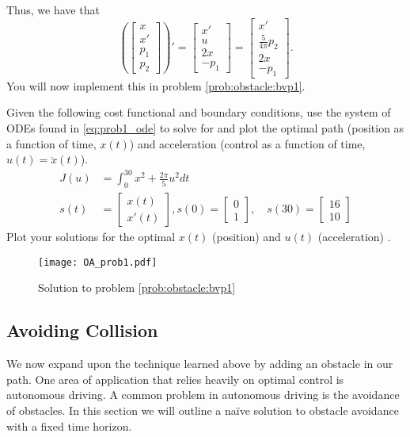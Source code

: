 Thus, we have that
\begin{equation}\label{eq:prob1_ode}
	\left( \begin{bmatrix}x\\x'\\p_1\\p_2\end{bmatrix} \right)' = \begin{bmatrix}x'\\u\\2x\\-p_1\end{bmatrix} = \begin{bmatrix}x'\\ \frac{5}{4\pi}p_2\\2x\\-p_1\end{bmatrix}.
\end{equation}
You will now implement this in problem \ref{prob:obstacle:bvp1}.

\begin{problem}
\label{prob:obstacle:bvp1}
Given the following cost functional and boundary conditions, use the system of ODEs found in \ref{eq:prob1_ode} to solve for and plot the optimal path (position as a function of time, $x(t)$) and acceleration (control as a function of time, $u(t)=\ddot x(t)$).
\begin{align*}
    J(u) &= \int_0^{30} x^2 + \frac{2\pi}{5}u^2dt \\
    s(t) &= \begin{bmatrix}x(t)\\x'(t) \end{bmatrix}, s(0) = \begin{bmatrix}0\\1 \end{bmatrix}, \quad s(30) = \begin{bmatrix}16\\10 \end{bmatrix}
\end{align*}
Plot your solutions for the optimal $x(t)$ (position) and $u(t)$ (acceleration) .
\end{problem}

\begin{figure}[H]
    \centering
    \texttt{[image: OA\_prob1.pdf]}
    \caption{Solution to problem \ref{prob:obstacle:bvp1}}
    \label{fig:OA_prob1}
\end{figure}

\subsection*{Avoiding Collision}
We now expand upon the technique learned above by adding an obstacle in our path.
One area of application that relies heavily on optimal control is autonomous driving.
A common problem in autonomous driving is the avoidance of obstacles.
In this section we will outline a naïve solution to obstacle avoidance with a fixed time horizon.

